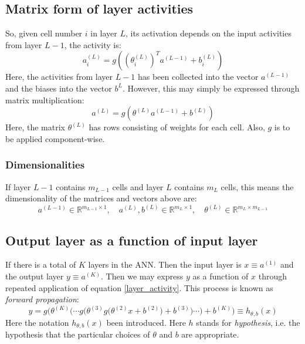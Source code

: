 \documentclass[12pt, a4paper]{article}
\numberwithin{equation}{section}
\begin{document}
\subsection{Matrix form of layer activities}
So, given cell number $i$ in layer $L$, its activation depends on the input activities from layer $L-1$, the activity is:
\begin{equation}
\label{layer_activity}
a^{(L)}_i=g\left(\left(\theta^{(L)}_i\right)^T a^{(L-1)} + b_i^{(L)}\right)
\end{equation}
Here, the activities from layer $L-1$ has been collected into the vector $a^{(L-1)}$ and the biases into the vector $b^{L}$. However, this may simply be expressed through matrix multiplication:
\begin{equation}
a^{(L)}=g\left(\theta^{(L)}a^{(L-1)}+b^{(L)}\right)
\end{equation}
Here, the matrix $\theta^{(L)}$ has rows consisting of weights for each cell. Also, $g$ is to be applied component-wise.

\subsubsection{Dimensionalities}
If layer $L-1$ contains $m_{L-1}$ cells and layer $L$ contains $m_L$ cells, this means the dimensionality of the matrices and vectors above are:
\begin{equation}
a^{(L-1)}\in\mathbb{R}^{m_{L-1}\times 1},\quad a^{(L)}, b^{(L)}\in\mathbb{R}^{m_L\times 1},\quad\theta^{(L)}\in\mathbb{R}^{m_L\times m_{L-1}} 
\end{equation}

\subsection{Output layer as a function of input layer}
If there is a total of $K$ layers in the ANN. Then the input layer is $x\equiv a^{(1)}$ and the output layer $y\equiv a^{(K)}$. Then we may express $y$ as a function of $x$ through repeated application of equation \ref{layer_activity}. This process is known as \textit{forward propagation}:
\begin{equation}
y=g\Bigg(\theta^{(K)}\bigg(\cdots g\Big(\theta^{(3)} g\big(\theta^{(2)}x+b^{(2)}\big)+b^{(3)}\Big)\cdots\bigg)+b^{(K)}\Bigg)\equiv h_{\theta,b}(x)
\end{equation}
Here the notation $h_{\theta,b}(x)$ been introduced. Here $h$ stands for \textit{hypothesis}, i.e. the hypothesis that the particular choices of $\theta$ and $b$ are appropriate.
\end{document}

